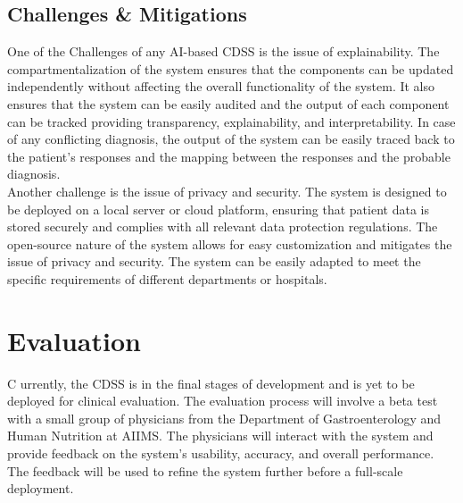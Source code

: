 \subsection{Challenges \& Mitigations}
One of the Challenges of any AI-based CDSS is the issue of explainability. The compartmentalization of the system ensures that the components can be updated independently without affecting the overall functionality of the system. It also ensures that the system can be easily audited and the output of each component can be tracked providing transparency, explainability, and interpretability. In case of any conflicting diagnosis, the output of the system can be easily traced back to the patient's responses and the mapping between the responses and the probable diagnosis.\\[\baselineskip]

\noindent Another challenge is the issue of privacy and security. The system is designed to be deployed on a local server or cloud platform, ensuring that patient data is stored securely and complies with all relevant data protection regulations. The open-source nature of the system allows for easy customization and mitigates the issue of privacy and security. The system can be easily adapted to meet the specific requirements of different departments or hospitals.\\[\baselineskip]

\section{Evaluation}
\lettrine{C}{ }urrently, the CDSS is in the final stages of development and is yet to be deployed for clinical evaluation. The evaluation process will involve a beta test with a small group of physicians from the Department of Gastroenterology and Human Nutrition at AIIMS. The physicians will interact with the system and provide feedback on the system's usability, accuracy, and overall performance. The feedback will be used to refine the system further before a full-scale deployment.\\[\baselineskip]